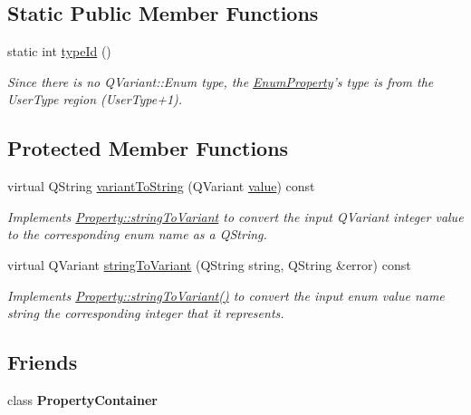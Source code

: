 \subsection*{Static Public Member Functions}
\begin{DoxyCompactItemize}
\item 
\hypertarget{class_picto_1_1_enum_property_a5c03c872e181dce86f51142eae91d086}{static int \hyperlink{class_picto_1_1_enum_property_a5c03c872e181dce86f51142eae91d086}{type\-Id} ()}\label{class_picto_1_1_enum_property_a5c03c872e181dce86f51142eae91d086}

\begin{DoxyCompactList}\small\item\em Since there is no Q\-Variant\-::\-Enum type, the \hyperlink{class_picto_1_1_enum_property}{Enum\-Property}'s type is from the User\-Type region (User\-Type+1). \end{DoxyCompactList}\end{DoxyCompactItemize}
\subsection*{Protected Member Functions}
\begin{DoxyCompactItemize}
\item 
virtual Q\-String \hyperlink{class_picto_1_1_enum_property_afc149e54a48cbe6540166bd2d7685e08}{variant\-To\-String} (Q\-Variant \hyperlink{class_picto_1_1_property_a69540c9d4f9a4b0b128b4c6a876d67ca}{value}) const 
\begin{DoxyCompactList}\small\item\em Implements \hyperlink{class_picto_1_1_property_a97d52011d6db190c5c28a21d76ac1d3b}{Property\-::string\-To\-Variant} to convert the input Q\-Variant integer value to the corresponding enum name as a Q\-String. \end{DoxyCompactList}\item 
virtual Q\-Variant \hyperlink{class_picto_1_1_enum_property_a6c5cce4bad6e9628c081f25ae8a9c14d}{string\-To\-Variant} (Q\-String string, Q\-String \&error) const 
\begin{DoxyCompactList}\small\item\em Implements \hyperlink{class_picto_1_1_property_a97d52011d6db190c5c28a21d76ac1d3b}{Property\-::string\-To\-Variant()} to convert the input enum value name string the corresponding integer that it represents. \end{DoxyCompactList}\end{DoxyCompactItemize}
\subsection*{Friends}
\begin{DoxyCompactItemize}
\item 
\hypertarget{class_picto_1_1_enum_property_a7ff968ca40027b2b0500a9260b463e3a}{class {\bfseries Property\-Container}}\label{class_picto_1_1_enum_property_a7ff968ca40027b2b0500a9260b463e3a}

\end{DoxyCompactItemize}
